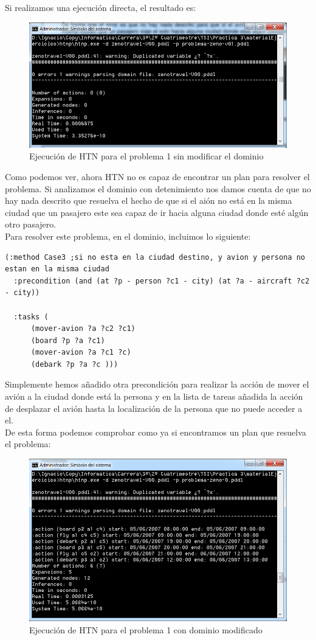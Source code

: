 Si realizamos una ejecución directa, el resultado es:

\begin{figure}[H]
\centering
\includegraphics[width=0.7\linewidth]{p11}
\caption{Ejecución de HTN para el problema 1 sin modificar el dominio}
\label{fig:p1}
\end{figure}

Como podemos ver, ahora HTN no es capaz de encontrar un plan para resolver el problema. Si analizamos el dominio con detenimiento nos damos cuenta de que no hay nada descrito que resuelva el hecho de que si el aión no está en la misma ciudad que un pasajero este sea capaz de ir hacia alguna ciudad donde esté algún otro pasajero.\\

Para resolver este problema, en el dominio, incluimos lo siguiente:



	
	\begin{lstlisting}[language=SH]
  (:method Case3 ;si no esta en la ciudad destino, y avion y persona no estan en la misma ciudad
  :precondition (and (at ?p - person ?c1 - city) (at ?a - aircraft ?c2 - city))
  
  :tasks ( 
	  (mover-avion ?a ?c2 ?c1)
	  (board ?p ?a ?c1)
	  (mover-avion ?a ?c1 ?c)
	  (debark ?p ?a ?c )))

	\end{lstlisting}

Simplemente hemos añadido otra precondición para realizar la acción de mover el avión a la ciudad donde está la persona y en la lista de tareas añadida la acción de desplazar el avión hasta la localización de la persona que no puede acceder a el.\\	
	
De esta forma podemos comprobar como ya si encontramos un plan que resuelva el problema:

\begin{figure}[H]
	\centering
	\includegraphics[width=0.7\linewidth]{p12}
	\caption{Ejecución de HTN para el problema 1 con dominio modificado}
	\label{fig:p12}
\end{figure}
		
